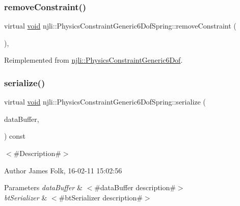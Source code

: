 \subsubsection{\texorpdfstring{remove\+Constraint()}{removeConstraint()}}
{\footnotesize\ttfamily virtual \mbox{\hyperlink{_thread_8h_af1e856da2e658414cb2456cb6f7ebc66}{void}} njli\+::\+Physics\+Constraint\+Generic6\+Dof\+Spring\+::remove\+Constraint (\begin{DoxyParamCaption}{ }\end{DoxyParamCaption})\hspace{0.3cm}{\ttfamily [protected]}, {\ttfamily [virtual]}}



Reimplemented from \mbox{\hyperlink{classnjli_1_1_physics_constraint_generic6_dof_ac57766961297ad087fb0ee7dc26e17d8}{njli\+::\+Physics\+Constraint\+Generic6\+Dof}}.

\mbox{\label{classnjli_1_1_physics_constraint_generic6_dof_spring_a8d00ec82407e32449b1e9016c13ca301}} 
\subsubsection{\texorpdfstring{serialize()}{serialize()}}
{\footnotesize\ttfamily virtual \mbox{\hyperlink{_thread_8h_af1e856da2e658414cb2456cb6f7ebc66}{void}} njli\+::\+Physics\+Constraint\+Generic6\+Dof\+Spring\+::serialize (\begin{DoxyParamCaption}\item[{\mbox{\hyperlink{_thread_8h_af1e856da2e658414cb2456cb6f7ebc66}{void}} $\ast$}]{data\+Buffer,  }\item[{bt\+Serializer $\ast$}]{ }\end{DoxyParamCaption}) const\hspace{0.3cm}{\ttfamily [virtual]}}



$<$\#\+Description\#$>$ 

\begin{DoxyAuthor}{Author}
James Folk, 16-\/02-\/11 15\+:02\+:56
\end{DoxyAuthor}

\begin{DoxyParams}{Parameters}
{\em data\+Buffer} & $<$\#data\+Buffer description\#$>$ \\
\hline
{\em bt\+Serializer} & $<$\#bt\+Serializer description\#$>$ \\
\hline
\end{DoxyParams}


